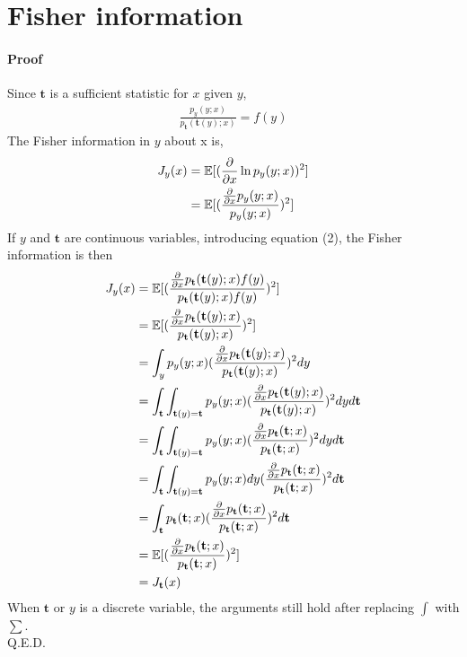 \documentclass{article}
\begin{document}
\section{Fisher information}
\paragraph{Proof}
Since $\mathbf{t}$ is a sufficient statistic for $x$ given $y$,
\begin{align}
	\frac{p_y(y;x)}{p_{\mathbf{t}}(\mathbf{t}(y);x)}=f(y)
\end{align}
The Fisher information in $y$ about x is, 
\begin{align}
	J_y(x)&=\mathbb{E}[(\frac{\partial}{\partial x}\ln p_y(y;x))^2]\notag\\
	&=\mathbb{E}[(\frac{\frac{\partial}{\partial x}p_y(y;x)}{p_y(y;x)})^2]\notag
\end{align}
If $y$ and $\mathbf{t}$ are continuous variables, introducing equation (2), the Fisher information is then
\begin{align}
	J_y(x)&=\mathbb{E}[(\frac{\frac{\partial}{\partial x}p_{\mathbf{t}}(\mathbf{t}(y);x)f(y)}{p_{\mathbf{t}}(\mathbf{t}(y);x)f(y)})^2]\notag\\
	&=\mathbb{E}[(\frac{\frac{\partial}{\partial x}p_{\mathbf{t}}(\mathbf{t}(y);x)}{p_{\mathbf{t}}(\mathbf{t}(y);x)})^2]\notag\\
	&=\int_y p_y(y;x)(\frac{\frac{\partial}{\partial x}p_{\mathbf{t}}(\mathbf{t}(y);x)}{p_{\mathbf{t}}(\mathbf{t}(y);x)})^2 dy\notag\\
	&=\int_{\mathbf{t}}\int_{\mathbf{t}(y)=\mathbf{t}} p_y(y;x)(\frac{\frac{\partial}{\partial x}p_{\mathbf{t}}(\mathbf{t}(y);x)}{p_{\mathbf{t}}(\mathbf{t}(y);x)})^2 dyd\mathbf{t}\notag\\
	&=\int_{\mathbf{t}}\int_{\mathbf{t}(y)=\mathbf{t}} p_y(y;x)(\frac{\frac{\partial}{\partial x}p_{\mathbf{t}}(\mathbf{t};x)}{p_{\mathbf{t}}(\mathbf{t};x)})^2 dyd\mathbf{t}\notag\\
	&=\int_{\mathbf{t}}\int_{\mathbf{t}(y)=\mathbf{t}} p_y(y;x)dy(\frac{\frac{\partial}{\partial x}p_{\mathbf{t}}(\mathbf{t};x)}{p_{\mathbf{t}}(\mathbf{t};x)})^2 d\mathbf{t}\notag\\
	&=\int_{\mathbf{t}}p_{\mathbf{t}}(\mathbf{t};x)(\frac{\frac{\partial}{\partial x}p_{\mathbf{t}}(\mathbf{t};x)}{p_{\mathbf{t}}(\mathbf{t};x)})^2 d\mathbf{t}\notag\\
	&=\mathbb{E}[(\frac{\frac{\partial}{\partial x}p_{\mathbf{t}}(\mathbf{t};x)}{p_{\mathbf{t}}(\mathbf{t};x)})^2]\notag\\
	&=J_{\mathbf{t}}(x)\notag
\end{align}
When $\mathbf{t}$ or $y$ is a discrete variable, the arguments still hold after replacing $\int$ with $\sum$.\\
Q.E.D.
\end{document}
